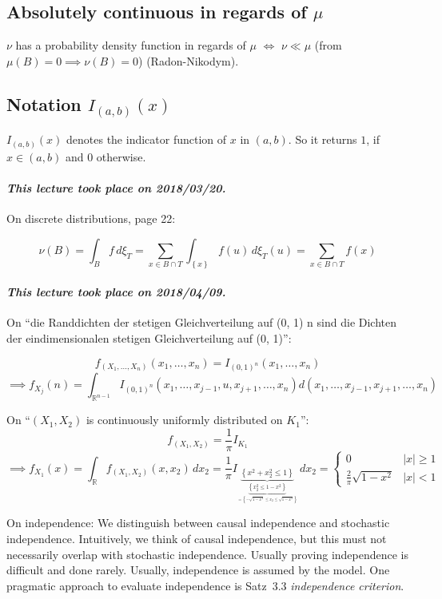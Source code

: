 \documentclass{article}
\newcommand{\set}[1]{\left\{#1\right\}}
\newcommand{\card}[1]{\left|#1\right|}
\newcommand{\dateref}[1]{\paragraph{\textit{This lecture took place on #1.}}}
\begin{document}
\subsection{Absolutely continuous in regards of $\mu$}
%
$\nu$ has a probability density function in regards of $\mu$ $\iff$ $\nu \ll \mu$ (from $\mu(B) = 0 \implies \nu(B) = 0$) (Radon-Nikodym).

\subsection{Notation $I_{(a,b)}(x)$}
%
$I_{(a,b)}(x)$ denotes the indicator function of $x$ in $(a,b)$. So it returns $1$, if $x \in (a,b)$ and $0$ otherwise.

\dateref{2018/03/20}

On discrete distributions, page 22:

\[ \nu(B) = \int_B f \, d\xi_T = \sum_{x \in B \cap T} \int_{\set{x}} f(u) \, d \xi_T(u) = \sum_{x \in B \cap T} f(x) \]

\dateref{2018/04/09}

On \enquote{die Randdichten der stetigen Gleichverteilung auf (0, 1) n sind die Dichten der
eindimensionalen stetigen Gleichverteilung auf (0, 1)}:

\[
  f_{(X_1, \dots, X_n)}(x_1, \dots, x_n) = I_{(0,1)^n}(x_1, \dots, x_n)
\] \[
  \implies f_{X_j}(n) = \int_{\mathbb R^{n-1}} I_{(0,1)^n} (x_1, \dots, x_{j-1}, u, x_{j+1}, \dots, x_n) d(x_1, \dots, x_{j-1}, x_{j+1}, \dots, x_n)
\]

On \enquote{$(X_1, X_2)$ is continuously uniformly distributed on $K_1$}:
\[ f_{(X_1, X_2)} = \frac1\pi I_{K_1} \]
\[
  \implies f_{X_1}(x) = \int_{\mathbb R} f_{(X_1, X_2)} (x, x_2) \, dx_2
  = \frac1\pi I_{\underbrace{\set{x^2 + x_2^2 \leq 1}}_{\underbrace{\set{x_2^2 \leq 1 - x^2}}_{= \set{-\sqrt{1 - x^2} \leq x_2 \leq \sqrt{1 - x^2}}}}} \, dx_2
  = \begin{cases} 0 & \card{x} \geq 1 \\ \frac2\pi \sqrt{1 - x^2} & \card{x} < 1 \end{cases}
\]

On independence: We distinguish between causal independence and stochastic independence. Intuitively, we think of causal independence, but this must not necessarily overlap with stochastic independence. Usually proving independence is difficult and done rarely. Usually, independence is assumed by the model. One pragmatic approach to evaluate independence is Satz~3.3 \emph{independence criterion}.
\end{document}
